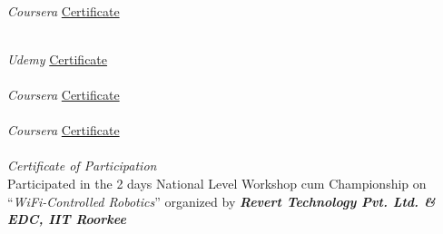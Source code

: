  \\
{\textit{Coursera} \hfill \href{https://coursera.org/share/5d942651257bf9294edf54fe8b26c023}{Certificate}}

 \\
{\textit{Udemy} \hfill \href{https://www.udemy.com/certificate/UC-3d21bc2c-e132-4c08-a555-2b50d15b0f86/}{Certificate}} \\

 \\
{\textit{Coursera} \hfill \href{https://www.coursera.org/account/accomplishments/certificate/H2DAULZMQJW7}{Certificate}} \\


 \\
{\textit{Coursera} \hfill \href{https://www.coursera.org/account/accomplishments/certificate/L8BUR4RY7U36}{Certificate}} \\

 \\
\textit{Certificate of Participation} \\
{Participated in the 2 days National Level Workshop cum Championship on ``\textit{WiFi-Controlled Robotics}'' organized by \textbf{\textit{Revert Technology Pvt. Ltd. \& EDC, IIT Roorkee}}}



